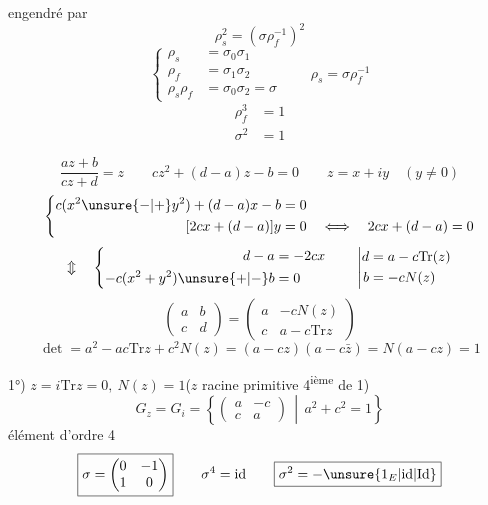engendré par
\[\rho_s^2=(\sigma\rho_f^{-1})^2\]
\[
\left\{\begin{aligned}
\rho_s&=\sigma_0\sigma_1\\
\rho_f&=\sigma_1\sigma_2\\
\rho_s\rho_f&=\sigma_0\sigma_2=\sigma
\end{aligned}\right.
\qquad\rho_s=\sigma\rho_f^{-1}
\]
\[\boxed{\begin{aligned}\rho_f^3&=1\\\sigma^2&=1\end{aligned}}\]

\[
\frac{az+b}{cz+d}=z\qquad cz^2+(d-a)z-b=0\qquad z=x+iy\quad(y\ne0)
\]
\[
\left\{\begin{aligned}
c(x^2\unsure{-|+}y^2)+(d-a)x-b&=0\\
[2cx+(d-a)]y&=0\quad\Longleftrightarrow\quad2cx+(d-a)=0
\end{aligned}\right.
\]
\[
\Updownarrow\quad
\left\{\begin{aligned}d-a&=-2cx\\-c(x^2+y^2)\unsure{+|-}b&=0\end{aligned}\right.
\qquad
\left|\begin{aligned}d&=a-c\mathrm{Tr}(z)\\b&=-cN(z)\end{aligned}\right.
\]
\[
\begin{pmatrix}a&b\\c&d\end{pmatrix}
=\begin{pmatrix}a&-cN(z)\\c&a-c\mathrm{Tr}z\end{pmatrix}
\]
\[
\det=a^2-ac\mathrm{Tr}z+c^2N(z)=(a-cz)(a-c\bar{z})=N(a-cz)=1
\]

1°) $z=i$\quad $\mathrm{Tr}z=0,\ N(z)=1$\quad ($z$ racine primitive 4\textsuperscript{ième} de 1)
\[
G_z=G_i=\left\{\begin{pmatrix}a&-c\\c&a\end{pmatrix}\,\middle|\,a^2+c^2=1\right\}
\]
élément d'ordre 4
\[
\boxed{\sigma=\begin{pmatrix}0&-1\\1&0\end{pmatrix}}
\qquad\sigma^4=\mathrm{id}\qquad\boxed{\sigma^2=-\unsure{1_E|\mathrm{id}|\mathrm{Id}}}
\]

